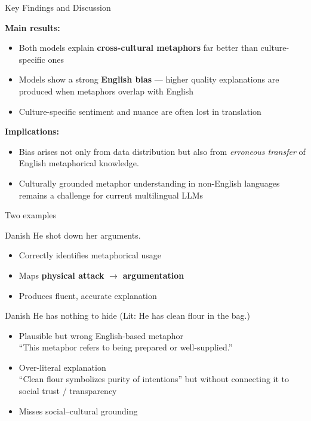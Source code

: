 \documentclass[xetex]{beamer}  %
\begin{document}
\begin{frame}{Key Findings and Discussion}

\textbf{Main results:}
\begin{itemize}
  \item Both models explain \textbf{cross-cultural metaphors} far better than culture-specific ones
  \item Models show a strong \textbf{English bias} — higher quality explanations are produced when metaphors overlap with English
  \item Culture-specific sentiment and nuance are often lost in translation
\end{itemize}

\medskip
\textbf{Implications:}
\begin{itemize}
  \item Bias arises not only from data distribution but also from \emph{erroneous transfer} of English metaphorical knowledge. 
  \item Culturally grounded metaphor understanding in non-English languages remains a challenge for current multilingual LLMs
\end{itemize}

\end{frame}

\begin{frame}{Two examples}
  \begin{exe}
    \ex {} \hfill Danish
    \trans He shot down her arguments.
  \end{exe}
  \begin{itemize}
  \item Correctly identifies metaphorical usage
  \item Maps \textbf{physical attack} $\rightarrow$ \textbf{argumentation}
  \item Produces fluent, accurate explanation
  \end{itemize}

  \begin{exe}
    \ex {} \hfill Danish
    \trans He has nothing to hide (Lit: He has clean flour in the bag.)
  \end{exe}
  \begin{itemize}
  \item Plausible but wrong English-based metaphor
    \\ “This metaphor refers to being prepared or well-supplied.”
  \item Over-literal explanation
    \\ “Clean flour symbolizes purity of intentions”
    but without connecting it to social trust / transparency
  \item Misses social–cultural grounding
  \end{itemize}


\end{frame}
\end{document}
